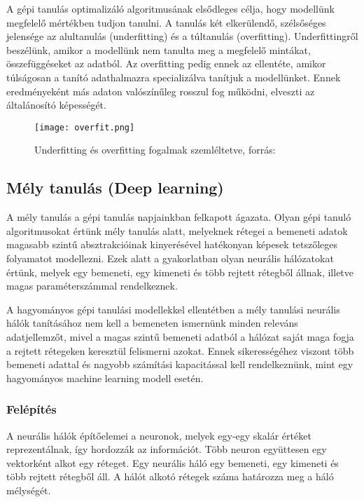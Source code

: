 A gépi tanulás optimalizáló algoritmusának elsődleges célja, hogy modellünk megfelelő mértékben tudjon tanulni. A tanulás két elkerülendő, szélsőséges jelensége az alultanulás (underfitting) és a túltanulás (overfitting). Underfittingről beszélünk, amikor a modellünk nem tanulta meg a megfelelő mintákat, összefüggéseket az adatból. Az overfitting pedig ennek az ellentéte, amikor túlságosan a tanító adathalmazra specializálva tanítjuk a modellünket. Ennek eredményeként más adaton valószínűleg rosszul fog működni, elveszti az általánosító képességét.

\begin{figure}[H]
  \texttt{[image: overfit.png]}
  \caption{Underfitting és overfitting fogalmak szemléltetve, forrás: \cite{deeplearningbook}}
\end{figure}


\subsection{Mély tanulás (Deep learning)}

A mély tanulás a gépi tanulás napjainkban felkapott ágazata. Olyan gépi tanuló algoritmusokat értünk mély tanulás alatt, melyeknek rétegei a bemeneti adatok magasabb szintű absztrakcióinak kinyerésével hatékonyan képesek tetszőleges folyamatot modellezni. Ezek alatt a gyakorlatban olyan neurális hálózatokat értünk, melyek egy bemeneti, egy kimeneti és több rejtett rétegből állnak, illetve magas paraméterszámmal rendelkeznek. \cite{azuredl}

A hagyományos gépi tanulási modellekkel ellentétben a mély tanulási neurális hálók tanításához nem kell a bemeneten ismernünk minden releváns adatjellemzőt, mivel a magas szintű bemeneti adatból a hálózat saját maga fogja a rejtett rétegeken keresztül felismerni azokat. Ennek sikerességéhez viszont több bemeneti adattal és nagyobb számítási kapacitással kell rendelkeznünk, mint egy hagyományos machine learning modell esetén. \cite{azuredl}

\subsubsection{Felépítés}

A neurális hálók építőelemei a neuronok, melyek egy-egy skalár értéket reprezentálnak, így hordozzák az információt. Több neuron együttesen egy vektorként alkot egy réteget. Egy neurális háló egy bemeneti, egy kimeneti és több rejtett rétegből áll. A hálót alkotó rétegek száma határozza meg a háló mélységét. \cite{Choi2017}

